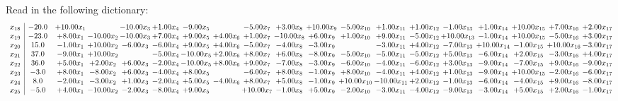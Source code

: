 \documentclass[9pt]{article}
\begin{document}
Read in the following dictionary:
\[\begin{array}{c| c c@{\hskip 2pt} c@{\hskip 2pt} c@{\hskip 2pt} c@{\hskip 2pt} c@{\hskip 2pt} c@{\hskip 2pt} c@{\hskip 2pt} c@{\hskip 2pt} c@{\hskip 2pt} c@{\hskip 2pt} c@{\hskip 2pt} c@{\hskip 2pt} c@{\hskip 2pt} c@{\hskip 2pt} c@{\hskip 2pt} c@{\hskip 2pt} c@{\hskip 2pt} }
 x_{18}   &  -20.0 & + 10.00 x_{1} &   & -10.00 x_{3} & +  1.00 x_{4} & -9.00 x_{5} &   & -5.00 x_{7} & +  3.00 x_{8} & + 10.00 x_{9} & -5.00 x_{10} & +  1.00 x_{11} & +  1.00 x_{12} & -1.00 x_{13} & +  1.00 x_{14} & + 10.00 x_{15} & +  7.00 x_{16} & +  2.00 x_{17}\\
 x_{19}   &  -23.0 & +  8.00 x_{1} & -10.00 x_{2} & -10.00 x_{3} & +  7.00 x_{4} & +  9.00 x_{5} & +  4.00 x_{6} & +  1.00 x_{7} & -10.00 x_{8} & +  6.00 x_{9} & +  1.00 x_{10} & +  9.00 x_{11} & -5.00 x_{12} & + 10.00 x_{13} & -1.00 x_{14} & + 10.00 x_{15} & -5.00 x_{16} & +  3.00 x_{17}\\
 x_{20}   &  15.0 & -1.00 x_{1} & + 10.00 x_{2} & -6.00 x_{3} & -6.00 x_{4} & +  9.00 x_{5} & +  4.00 x_{6} & -5.00 x_{7} & -4.00 x_{8} & -3.00 x_{9} &   & -3.00 x_{11} & +  4.00 x_{12} & -7.00 x_{13} & + 10.00 x_{14} & -1.00 x_{15} & + 10.00 x_{16} & -3.00 x_{17}\\
 x_{21}   &  37.0 & -9.00 x_{1} & + 10.00 x_{2} &   & -5.00 x_{4} & -10.00 x_{5} & +  2.00 x_{6} & +  8.00 x_{7} & +  6.00 x_{8} & -8.00 x_{9} & -5.00 x_{10} & -5.00 x_{11} & -5.00 x_{12} & +  5.00 x_{13} & -6.00 x_{14} & +  2.00 x_{15} & -3.00 x_{16} & +  4.00 x_{17}\\
 x_{22}   &  36.0 & +  5.00 x_{1} & +  2.00 x_{2} & +  6.00 x_{3} & -2.00 x_{4} & -10.00 x_{5} & +  8.00 x_{6} & +  9.00 x_{7} & -7.00 x_{8} & -3.00 x_{9} & -6.00 x_{10} & -4.00 x_{11} & -6.00 x_{12} & +  3.00 x_{13} & -9.00 x_{14} & -7.00 x_{15} & +  9.00 x_{16} & -9.00 x_{17}\\
 x_{23}   &  -3.0 & +  8.00 x_{1} & -8.00 x_{2} & +  6.00 x_{3} & -4.00 x_{4} & +  8.00 x_{5} &   & -6.00 x_{7} & +  8.00 x_{8} & -1.00 x_{9} & +  8.00 x_{10} & -4.00 x_{11} & +  4.00 x_{12} & +  1.00 x_{13} & -9.00 x_{14} & + 10.00 x_{15} & -2.00 x_{16} & -6.00 x_{17}\\
 x_{24}   &  8.0 & -2.00 x_{1} & -3.00 x_{2} & +  1.00 x_{3} & -2.00 x_{4} & +  5.00 x_{5} & -4.00 x_{6} & +  8.00 x_{7} & +  5.00 x_{8} & -1.00 x_{9} & + 10.00 x_{10} & -10.00 x_{11} & +  2.00 x_{12} & -1.00 x_{13} & -6.00 x_{14} & -4.00 x_{15} & +  9.00 x_{16} & -8.00 x_{17}\\
 x_{25}   &  -5.0 & +  4.00 x_{1} & -10.00 x_{2} & -2.00 x_{3} & -8.00 x_{4} & +  9.00 x_{5} &   & + 10.00 x_{7} & -1.00 x_{8} & +  5.00 x_{9} & -2.00 x_{10} & -3.00 x_{11} & -4.00 x_{12} & -9.00 x_{13} & -3.00 x_{14} & +  5.00 x_{15} & +  2.00 x_{16} & -1.00 x_{17}\\

\end{array}\]
\end{document}
